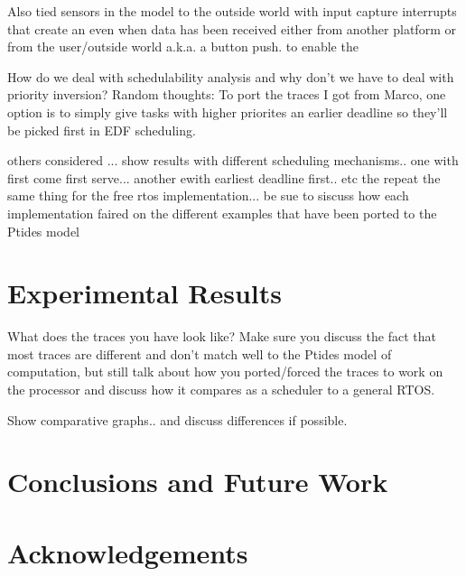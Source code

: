 \documentclass{sig-alternate}
\begin{document}
Also tied sensors in the model to the outside world with input capture interrupts that create an even when data has been received either from another platform or from the user/outside world a.k.a. a button push.
to enable the 

How do we deal with schedulability analysis and why don't we have to deal with priority inversion?
Random thoughts: To port the traces I got from Marco, one option is to simply give tasks with higher priorites an earlier deadline so they'll be picked first in EDF scheduling.


others considered ... show results with different scheduling mechanisms.. one with first come first serve... another ewith earliest deadline first.. etc
the repeat the same thing for the free rtos implementation...
be sue to siscuss how each implementation faired on the different examples that have been ported to the Ptides model

\section{Experimental Results}
What does the traces you have look like? Make sure you discuss the fact that most traces are different and don't match well to the Ptides model of computation, but still talk about how you ported/forced the traces to work on the processor and discuss how it compares as a scheduler to a general RTOS.

Show comparative graphs.. and discuss differences if possible.



\section{Conclusions and Future Work}
\label{scfw}
\section{Acknowledgements}

 


 
\end{document}
